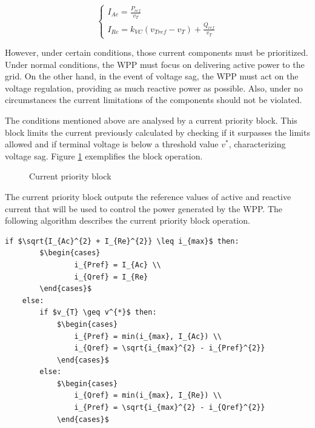 \begin{equation}
	\begin{cases}
		I_{Ac} = \frac{P_{ref}}{v_{T}} \\
		I_{Re} = k_{VC}(v_{Tref} - v_{T}) + \frac{Q_{ref}}{v_{T}}
	\end{cases}
	\label{eq: Currents}
\end{equation}

However, under certain conditions, those current components must be prioritized. Under normal conditions, the WPP must focus on delivering active power to the grid. On the other hand, in the event of voltage sag, the WPP must act on the voltage regulation, providing as much reactive power as possible. Also, under no circumstances the current limitations of the components should not be violated.

The conditions mentioned above are analysed by a current priority block. This block limits the current previously calculated by checking if it surpasses the limits allowed and if terminal voltage is below a threshold value $v^{*}$, characterizing voltage sag. Figure \ref{fig: CurrentPriority} exemplifies the block operation.

\begin{figure}
	\caption{Current priority block}
	\begin{center}
	\end{center}
	\label{fig: CurrentPriority}
\end{figure}

The current priority block outputs the reference values of active and reactive current that will be used to control the power generated by the WPP. The following algorithm describes the current priority block operation.

\begin{center}
	\begin{lstlisting}[mathescape, columns=fullflexible]
	if $\sqrt{I_{Ac}^{2} + I_{Re}^{2}} \leq i_{max}$ then:
		$\begin{cases}
				i_{Pref} = I_{Ac} \\
				i_{Qref} = I_{Re}
		\end{cases}$
	else:
		if $v_{T} \geq v^{*}$ then:	
			$\begin{cases}
				i_{Pref} = min(i_{max}, I_{Ac}) \\
				i_{Qref} = \sqrt{i_{max}^{2} - i_{Pref}^{2}}
			\end{cases}$
		else:
			$\begin{cases}
				i_{Qref} = min(i_{max}, I_{Re}) \\
				i_{Pref} = \sqrt{i_{max}^{2} - i_{Qref}^{2}}
			\end{cases}$
	\end{lstlisting}
\end{center}

